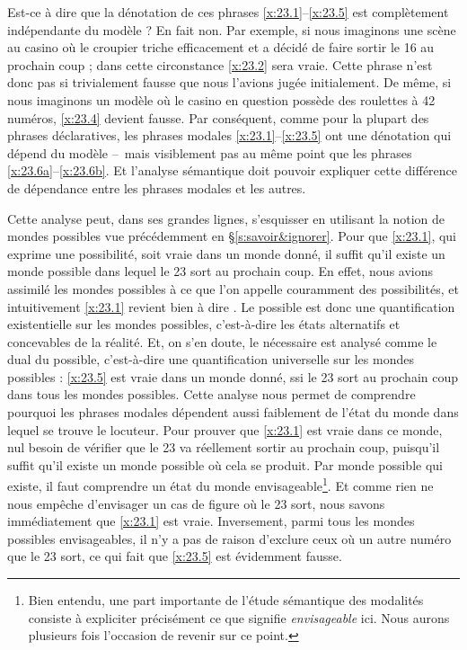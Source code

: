 Est-ce à dire que la dénotation de ces phrases
\ref{x:23.1}--\ref{x:23.5} est complètement indépendante du modèle ?
En fait non.  Par exemple, si nous imaginons une scène au casino où le
croupier triche efficacement et a décidé de faire sortir le 16 au
prochain coup ; dans cette circonstance \ref{x:23.2} sera vraie.  Cette
phrase n'est donc pas si trivialement fausse que nous l'avions jugée
initialement.  De même, si nous imaginons un modèle où le casino en
question possède des roulettes à 42 numéros, \ref{x:23.4} devient
fausse.  Par conséquent, comme pour la plupart des phrases
déclaratives, les phrases modales \ref{x:23.1}--\ref{x:23.5} ont une
dénotation qui dépend du modèle --~mais visiblement pas au même point
que les phrases \ref{x:23.6a}--\ref{x:23.6b}.  Et l'analyse sémantique
doit pouvoir expliquer cette différence de dépendance entre les
phrases modales et les autres.

Cette analyse peut, dans ses grandes lignes, s'esquisser %
en utilisant la notion de mondes possibles vue précédemment en
\S\ref{s:savoir&ignorer}. Pour que \ref{x:23.1}, qui exprime une possibilité, soit vraie dans un monde donné,  il suffit qu'il existe un monde possible dans lequel le 23 sort au prochain coup. 
En effet, nous avions assimilé les mondes possibles à ce que l'on appelle couramment des possibilités, et intuitivement \ref{x:23.1} revient bien à dire . Le possible est donc une quantification existentielle sur les mondes possibles, c'est-à-dire les états alternatifs et concevables de la réalité. Et, on s'en doute, le nécessaire est analysé comme le dual du possible, c'est-à-dire une quantification universelle sur les mondes possibles : \ref{x:23.5} est vraie dans un monde donné, ssi le 23 sort au prochain coup dans tous les mondes possibles. 
Cette analyse nous permet de comprendre pourquoi les phrases modales dépendent aussi faiblement de l'état du monde dans lequel se trouve le locuteur.
Pour prouver que \ref{x:23.1} est vraie dans ce monde, nul besoin de vérifier que le 23 va réellement sortir au prochain coup, puisqu'il suffit qu'il existe un monde possible où cela se produit. Par monde possible qui existe, il faut comprendre un état du monde envisageable\footnote{Bien entendu, une part importante de l'étude sémantique des modalités consiste à expliciter précisément ce que signifie \emph{envisageable} ici. Nous aurons plusieurs fois l'occasion de revenir sur ce point.}. Et comme rien ne nous empêche d'envisager un cas de figure où le 23 sort, nous savons immédiatement que \ref{x:23.1} est vraie.  Inversement, parmi tous les mondes possibles envisageables, il n'y a pas de raison d'exclure ceux où un autre numéro que le 23 sort, ce qui fait que \ref{x:23.5} est évidemment fausse. 

